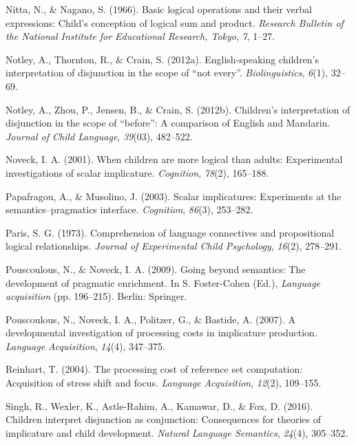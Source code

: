 \documentclass[,man,floatsintext]{apa6}
\begin{document}
\leavevmode\hypertarget{ref-nitta1966basic}{}%
Nitta, N., \& Nagano, S. (1966). Basic logical operations and their verbal expressions: Child's conception of logical sum and product. \emph{Research Bulletin of the National Institute for Educational Research, Tokyo}, \emph{7}, 1--27.

\leavevmode\hypertarget{ref-notley2012notevery}{}%
Notley, A., Thornton, R., \& Crain, S. (2012a). English-speaking children's interpretation of disjunction in the scope of ``not every''. \emph{Biolinguistics}, \emph{6}(1), 32--69.

\leavevmode\hypertarget{ref-notley2012children}{}%
Notley, A., Zhou, P., Jensen, B., \& Crain, S. (2012b). Children's interpretation of disjunction in the scope of ``before'': A comparison of English and Mandarin. \emph{Journal of Child Language}, \emph{39}(03), 482--522.

\leavevmode\hypertarget{ref-noveck2001children}{}%
Noveck, I. A. (2001). When children are more logical than adults: Experimental investigations of scalar implicature. \emph{Cognition}, \emph{78}(2), 165--188.

\leavevmode\hypertarget{ref-papafragou2003scalar}{}%
Papafragou, A., \& Musolino, J. (2003). Scalar implicatures: Experiments at the semantics--pragmatics interface. \emph{Cognition}, \emph{86}(3), 253--282.

\leavevmode\hypertarget{ref-paris1973comprehension}{}%
Paris, S. G. (1973). Comprehension of language connectives and propositional logical relationships. \emph{Journal of Experimental Child Psychology}, \emph{16}(2), 278--291.

\leavevmode\hypertarget{ref-pouscoulous2009going}{}%
Pouscoulous, N., \& Noveck, I. A. (2009). Going beyond semantics: The development of pragmatic enrichment. In S. Foster-Cohen (Ed.), \emph{Language acquisition} (pp. 196--215). Berlin: Springer.

\leavevmode\hypertarget{ref-pouscoulous2007developmental}{}%
Pouscoulous, N., Noveck, I. A., Politzer, G., \& Bastide, A. (2007). A developmental investigation of processing costs in implicature production. \emph{Language Acquisition}, \emph{14}(4), 347--375.

\leavevmode\hypertarget{ref-reinhart2004processing}{}%
Reinhart, T. (2004). The processing cost of reference set computation: Acquisition of stress shift and focus. \emph{Language Acquisition}, \emph{12}(2), 109--155.

\leavevmode\hypertarget{ref-Singh2016}{}%
Singh, R., Wexler, K., Astle-Rahim, A., Kamawar, D., \& Fox, D. (2016). Children interpret disjunction as conjunction: Consequences for theories of implicature and child development. \emph{Natural Language Semantics}, \emph{24}(4), 305--352.
\end{document}
